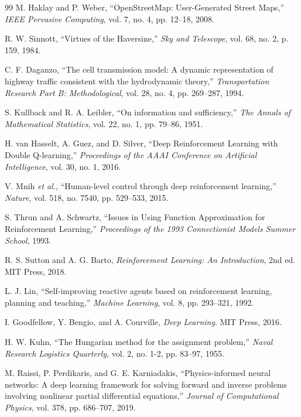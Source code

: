 \documentclass[conference]{IEEEtran}
\begin{document}
\begin{thebibliography}{99}
M. Haklay and P. Weber, ``OpenStreetMap: User-Generated Street Maps,'' \textit{IEEE Pervasive Computing}, vol. 7, no. 4, pp. 12--18, 2008.

R. W. Sinnott, ``Virtues of the Haversine,'' \textit{Sky and Telescope}, vol. 68, no. 2, p. 159, 1984.

C. F. Daganzo, ``The cell transmission model: A dynamic representation of highway traffic consistent with the hydrodynamic theory,'' \textit{Transportation Research Part B: Methodological}, vol. 28, no. 4, pp. 269--287, 1994.

S. Kullback and R. A. Leibler, ``On information and sufficiency,'' \textit{The Annals of Mathematical Statistics}, vol. 22, no. 1, pp. 79--86, 1951.

H. van Hasselt, A. Guez, and D. Silver, ``Deep Reinforcement Learning with Double Q-learning,'' \textit{Proceedings of the AAAI Conference on Artificial Intelligence}, vol. 30, no. 1, 2016.

V. Mnih \textit{et al.}, ``Human-level control through deep reinforcement learning,'' \textit{Nature}, vol. 518, no. 7540, pp. 529--533, 2015.

S. Thrun and A. Schwartz, ``Issues in Using Function Approximation for Reinforcement Learning,'' \textit{Proceedings of the 1993 Connectionist Models Summer School}, 1993.

R. S. Sutton and A. G. Barto, \textit{Reinforcement Learning: An Introduction}, 2nd ed. MIT Press, 2018.

L. J. Lin, ``Self-improving reactive agents based on reinforcement learning, planning and teaching,'' \textit{Machine Learning}, vol. 8, pp. 293--321, 1992.



I. Goodfellow, Y. Bengio, and A. Courville, \textit{Deep Learning}. MIT Press, 2016.

H. W. Kuhn, ``The Hungarian method for the assignment problem,'' \textit{Naval Research Logistics Quarterly}, vol. 2, no. 1-2, pp. 83--97, 1955.

M. Raissi, P. Perdikaris, and G. E. Karniadakis, ``Physics-informed neural networks: A deep learning framework for solving forward and inverse problems involving nonlinear partial differential equations,'' \textit{Journal of Computational Physics}, vol. 378, pp. 686--707, 2019.



\end{thebibliography}
\end{document}
